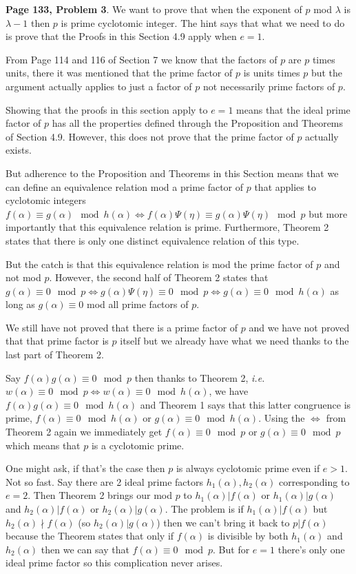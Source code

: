 \documentclass[aps,preprint,preprintnumbers,nofootinbib,showpacs,prd]{revtex4-1}
\newcommand{\ie}{{\it i.e.} }
\begin{document}
{\bf Page 133, Problem 3}. We want to prove that when the exponent of $p$ mod $\lambda$ is $\lambda - 1$ then $p$ is prime cyclotomic integer. The hint says that what we need to do is prove that the Proofs in this Section 4.9 apply when $e = 1$. 

From Page 114 and 116 of Section 7 we know that the factors of $p$ are $p$ times units, there it was mentioned that the prime factor of $p$ is units times $p$ but the argument actually applies to just a factor of $p$ not necessarily prime factors of $p$.

Showing that the proofs in this section apply to $e = 1$ means that the ideal prime factor of $p$ has all the properties defined through the Proposition and Theorems of Section 4.9. However, this does not prove that the prime factor of $p$ actually exists.

But adherence to the Proposition and Theorems in this Section means that we can define an equivalence relation mod a prime factor of $p$ that applies to cyclotomic integers $f(\alpha) \equiv g(\alpha) \mod{h(\alpha)} \Leftrightarrow f(\alpha)\Psi(\eta) \equiv g(\alpha)\Psi(\eta) \mod{p}$ but more importantly that this equivalence relation is prime. Furthermore, Theorem 2 states that there is only one distinct equivalence relation of this type.

But the catch is that this equivalence relation is mod the prime factor of $p$ and not mod $p$. However, the second half of Theorem 2 states that $g(\alpha) \equiv 0 \mod{p} \Leftrightarrow g(\alpha) \Psi(\eta)\equiv 0 \mod{p} \Leftrightarrow g(\alpha) \equiv 0 \mod{h(\alpha)}$ as long as $g(\alpha) \equiv 0$ mod all prime factors of $p$.

We still have not proved that there is a prime factor of $p$ and we have not proved that that prime factor is $p$ itself but we already have what we need thanks to the last part of Theorem 2.

Say $f(\alpha)g(\alpha) \equiv 0 \mod{p}$ then thanks to Theorem 2, \ie $w(\alpha) \equiv 0 \mod{p} \Leftrightarrow w(\alpha) \equiv 0 \mod{h(\alpha)}$, we have $f(\alpha)g(\alpha) \equiv 0 \mod{h(\alpha)}$ and Theorem 1 says that this latter congruence is prime, $f(\alpha) \equiv 0 \mod{h(\alpha)}$ or $g(\alpha) \equiv 0 \mod{h(\alpha)}$. Using the $\Leftrightarrow$ from Theorem 2 again we immediately get $f(\alpha) \equiv 0 \mod{p}$ or $g(\alpha) \equiv 0 \mod{p}$ which means that $p$ is a cyclotomic prime.

One might ask, if that's the case then $p$ is always cyclotomic prime even if $e > 1$. Not so fast. Say there are 2 ideal prime factors $h_1(\alpha), h_2(\alpha)$ corresponding to $e = 2$. Then Theorem 2 brings our mod $p$ to $h_1(\alpha)|f(\alpha)$ or $h_1(\alpha)|g(\alpha)$ and $h_2(\alpha)|f(\alpha)$ or $h_2(\alpha)|g(\alpha)$. The problem is if $h_1(\alpha)|f(\alpha)$ but $h_2(\alpha) \nmid f(\alpha)$ (so $h_2(\alpha)|g(\alpha)$) then we can't bring it back to $p|f(\alpha)$ because the Theorem states that only if $f(\alpha)$ is divisible by both $h_1(\alpha)$ and $h_2(\alpha)$ then we can say that $f(\alpha) \equiv 0 \mod{p}$. But for $e=1$ there's only one ideal prime factor so this complication never arises.
\end{document}
